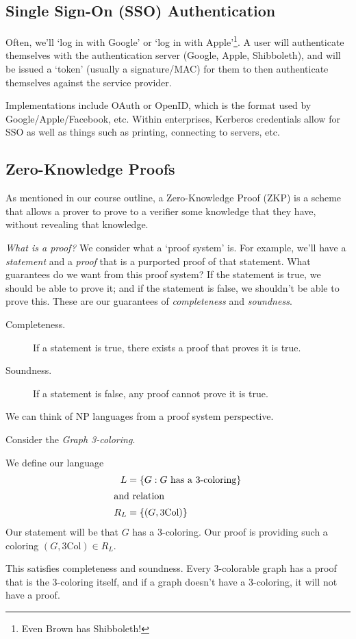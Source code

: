 

\subsection{Single Sign-On (SSO) Authentication}
Often, we'll `log in with Google' or `log in with Apple'\footnote{Even Brown has Shibboleth!}. A user will authenticate themselves with the authentication server (Google, Apple, Shibboleth), and will be issued a `token' (usually a signature/MAC) for them to then authenticate themselves against the service provider.

Implementations include OAuth or OpenID, which is the format used by Google/Apple/Facebook, etc. Within enterprises, Kerberos credentials allow for SSO as well as things such as printing, connecting to servers, etc.


\subsection{Zero-Knowledge Proofs}
As mentioned in our course outline, a Zero-Knowledge Proof (ZKP) is a scheme that allows a prover to prove to a verifier some knowledge that they have, without revealing that knowledge.

\emph{What is a proof?} We consider what a `proof system' is. For example, we'll have a \emph{statement} and a \emph{proof} that is a purported proof of that statement. What guarantees do we want from this proof system? If the statement is true, we should be able to prove it; and if the statement is false, we shouldn't be able to prove this. These are our guarantees of \emph{completeness} and \emph{soundness}.
\begin{description}
    \item[Completeness.] If a statement is true, there exists a proof that proves it is true.
    \item[Soundness.] If a statement is false, any proof cannot prove it is true.
\end{description}

We can think of NP languages from a proof system perspective.

\begin{example}
    Consider the \emph{Graph 3-coloring}.


    We define our language
    \begin{align*}
        L   & = \{G: G\text{ has a 3-coloring}\} \\
        \intertext{and relation}
        R_L & = \{(G, \textrm{3Col})\}
    \end{align*}
    Our statement will be that $G$ has a 3-coloring. Our proof is providing such a coloring $(G, \mathrm{3Col})\in R_L$.

    This satisfies completeness and soundness. Every 3-colorable graph has a proof that is the 3-coloring itself, and if a graph doesn't have a 3-coloring, it will not have a proof.
\end{example}

